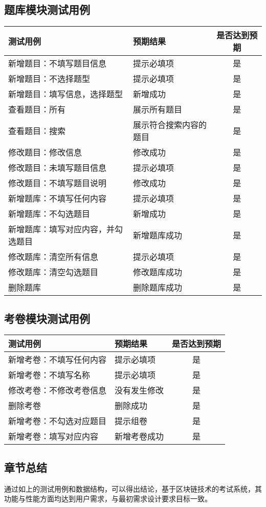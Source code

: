 \subsection{题库模块测试用例}
\begin{table}[ht!]
\begin{tabularx}{\linewidth}{@{}Xlc@{}}
\toprule
测试用例           & 预期结果      & 是否达到预期 \\ \midrule
新增题目：不填写题目信息 & 提示必填项 & 是 \\
新增题目：不选择题型 & 提示必填项 & 是  \\
新增题目：填写信息，选择题型 & 新增成功 & 是 \\
查看题目：所有 & 展示所有题目 & 是 \\
查看题目：搜索 & 展示符合搜索内容的题目 & 是 \\
修改题目：修改信息 & 修改成功 & 是 \\
修改题目：未填写题目信息 & 提示必填项 & 是 \\
修改题目：不填写题目说明 & 修改成功 & 是  \\
新增题库：不填写任何内容   & 提示必填项 & 是      \\
新增题库：不勾选题目 & 新增成功 & 是      \\
新增题库：填写对应内容，并勾选题目    & 新增题库成功    & 是   \\ 
修改题库：清空所有信息  & 提示必填项      & 是      \\
修改题库：清空勾选题目  & 修改题库成功    & 是      \\
删除题库 & 删除题库成功 & 是  \\ \bottomrule
\end{tabularx}
\end{table}

\subsection{考卷模块测试用例}
\begin{table}[ht!]
\begin{tabularx}{\linewidth}{@{}Xlc@{}}
\toprule
测试用例           & 预期结果      & 是否达到预期 \\ \midrule
新增考卷：不填写任何内容   & 提示必填项 & 是      \\
新增考卷：不填写名称 & 提示必填项 & 是      \\
修改考卷：不修改考卷信息  & 没有发生修改      & 是      \\
删除考卷  & 删除成功    & 是      \\
新增考卷：不勾选对应题目 & 提示组卷 & 是  \\
新增考卷：填写对应内容    & 新增考卷成功    & 是   \\ \bottomrule
\end{tabularx}
\end{table}


\subsection{章节总结}
通过如上的测试用例和数据结构，可以得出结论，基于区块链技术的考试系统，其功能与性能方面均达到用户需求，与最初需求设计要求目标一致。